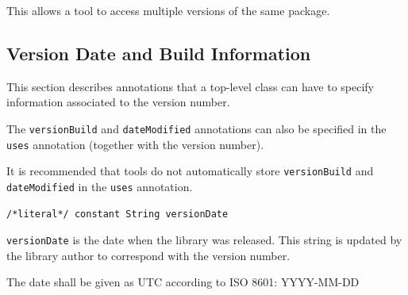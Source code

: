 This allows a tool to access multiple versions of the same package.


\subsection{Version Date and Build Information}\label{version-date-and-build-information}

This section describes annotations that a top-level class can have to specify information associated to the version number.

The \lstinline!versionBuild! and \lstinline!dateModified! annotations can also be specified in the \lstinline!uses! annotation (together with the version number).

\begin{nonnormative}
It is recommended that tools do not automatically store \lstinline!versionBuild! and \lstinline!dateModified! in the \lstinline!uses! annotation.
\end{nonnormative}

\begin{annotationdefinition}[versionDate]
\begin{synopsis}\begin{lstlisting}
/*literal*/ constant String versionDate
\end{lstlisting}\end{synopsis}
\begin{semantics}
\lstinline!versionDate! is the date when the library was released.
This string is updated by the library author to correspond with the version number.

The date shall be given as UTC according to ISO 8601: YYYY-MM-DD
\end{semantics}
\end{annotationdefinition}

